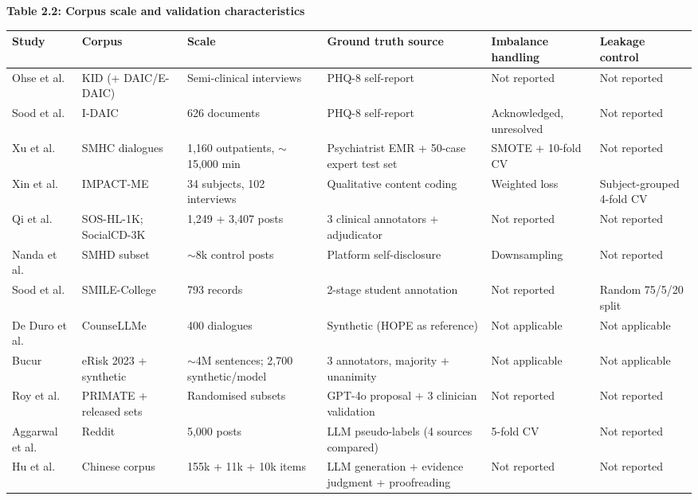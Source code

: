 \documentclass[11pt]{article}
\begin{document}
	\begin{center}
		\textbf{Table 2.2: Corpus scale and validation characteristics}
		\vspace{2pt}
		
		\scriptsize
		\setlength{\tabcolsep}{3pt}\renewcommand{\arraystretch}{1.1}
		\begin{tabularx}{\textwidth}{|X|X|X|X|X|X|}
			\hline
			\textbf{Study} & \textbf{Corpus} & \textbf{Scale} & \textbf{Ground truth source} & \textbf{Imbalance handling} & \textbf{Leakage control} \\
			\hline
			Ohse et al.\cite{OHSE2024101663} & KID (+ DAIC/E-DAIC) & Semi-clinical interviews & PHQ-8 self-report & Not reported & Not reported \\
			\hline
			Sood et al.\cite{10385480} & I-DAIC & 626 documents & PHQ-8 self-report & Acknowledged, unresolved & Not reported \\
			\hline
			Xu et al.\cite{Xu2025.01.03.24318117} & SMHC dialogues & 1,160 outpatients, $\sim$15,000 min & Psychiatrist EMR + 50-case expert test set & SMOTE + 10-fold CV & Not reported \\
			\hline
			Xin et al.\cite{xin2024outcomes} & IMPACT-ME & 34 subjects, 102 interviews & Qualitative content coding & Weighted loss & Subject-grouped 4-fold CV \\
			\hline
			Qi et al.\cite{qi2024supervisedlearninglargelanguage} & SOS-HL-1K; SocialCD-3K & 1,249 + 3,407 posts & 3 clinical annotators + adjudicator & Not reported & Not reported \\
			\hline
			Nanda et al.\cite{10714257} & SMHD subset & $\sim$8k control posts & Platform self-disclosure & Downsampling & Not reported \\
			\hline
			Sood et al.\cite{sood2024understandingstudentsentimentmental} & SMILE-College & 793 records & 2-stage student annotation & Not reported & Random 75/5/20 split \\
			\hline
			De Duro et al.\cite{DEDURO2025100170} & CounseLLMe & 400 dialogues & Synthetic (HOPE as reference) & Not applicable & Not applicable \\
			\hline
			Bucur\cite{bucur2024leveraging} & eRisk 2023 + synthetic & $\sim$4M sentences; 2,700 synthetic/model & 3 annotators, majority + unanimity & Not applicable & Not applicable \\
			\hline
			Roy et al.\cite{10.1145/3805697} & PRIMATE + released sets & Randomised subsets & GPT-4o proposal + 3 clinician validation & Not reported & Not reported \\
			\hline
			Aggarwal et al.\cite{10973522} & Reddit & 5,000 posts & LLM pseudo-labels (4 sources compared) & 5-fold CV & Not reported \\
			\hline
			Hu et al.\cite{hu2024psycollmenhancingllmpsychological} & Chinese corpus & 155k + 11k + 10k items & LLM generation + evidence judgment + proofreading & Not reported & Not reported \\
			\hline
		\end{tabularx}
	\end{center}
	
\end{document}
